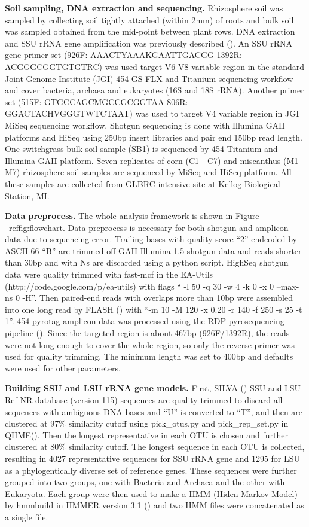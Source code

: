 \documentclass[12pt]{article}
\begin{document}
  {\bf Soil sampling, DNA extraction and sequencing. }
Rhizosphere soil was sampled by collecting soil tightly attached (within 2mm) of roots and bulk soil was sampled obtained from the mid-point between plant rows. DNA extraction and SSU rRNA gene amplification was previously described (\cite{ed2010}). An SSU rRNA gene primer set (926F: AAACTYAAAKGAATTGACGG 1392R: ACGGGCGGTGTGTRC) was used target V6-V8 variable region in the standard Joint Genome Institute (JGI) 454 GS FLX and Titanium sequencing workflow and cover bacteria, archaea and eukaryotes (16S and 18S rRNA). Another primer set (515F: GTGCCAGCMGCCGCGGTAA 806R: GGACTACHVGGGTWTCTAAT) was used to target V4 variable region in JGI MiSeq sequencing workflow. Shotgun sequencing is done with Illumina GAII platforms and HiSeq using 250bp insert libraries and pair end 150bp read length. One switchgrass bulk soil sample (SB1) is sequenced by 454 Titanium and Illumina GAII platform. Seven replicates of corn (C1 - C7) and miscanthus (M1 - M7) rhizosphere soil samples are sequenced by MiSeq and HiSeq platform. All these samples are collected from GLBRC intensive site at  Kellog Biological Station, MI.

  {\bf Data preprocess. }
  The whole analysis framework is shown in Figure ~ref{fig:flowchart}. Data preprocess is necessary for both shotgun and amplicon data due to sequencing error. Trailing bases with quality score ``2'' endcoded by ASCII 66 ``B'' are trimmed off GAII Illumina 1.5 shotgun data and reads shorter than 30bp and with Ns are discarded using a python script. HighSeq shotgun data were quality trimmed with fast-mcf in the EA-Utils (http://code.google.com/p/ea-utils) with flags `` -l 50 -q 30 -w 4 -k 0 -x 0 --max-ns 0 -H''. Then paired-end reads with overlaps more than 10bp were assembled into one long read by FLASH (\cite{flash2011}) with ``-m 10 -M 120 -x 0.20 -r 140 -f 250 -s 25 -t 1''. 454 pyrotag amplicon data was processed using the RDP pyrosequencing pipeline (\cite{rdp2009}). Since the targeted region is about 467bp (926F/1392R), the reads were not long enough to cover the whole region, so only the reverse primer was used for quality trimming. The minimum length was set to 400bp and defaults were used for other parameters.

  {\bf Building SSU and LSU rRNA gene models. }
First, SILVA (\cite{silva2013}) SSU and LSU Ref NR database (version 115) sequences are quality trimmed to discard all sequences with ambiguous DNA bases and ``U'' is converted to ``T'', and then are clustered at 97\% similarity cutoff using pick\_otus.py and pick\_rep\_set.py in QIIME(\cite{qiime}). Then the longest representative in each OTU is chosen and further clustered at 80\% similarity cutoff. The longest sequence in each OTU is collected, resulting in 4027 representative sequences for SSU rRNA gene and 1295 for LSU as a phylogentically diverse set of reference genes. These sequences were further grouped into two groups, one with Bacteria and Archaea and the other with Eukaryota. Each group were then used to make a HMM (Hiden Markov Model) by hmmbuild in HMMER version 3.1 (\cite{hmmer3}) and two HMM files were concatenated as a single file.
\end{document}
